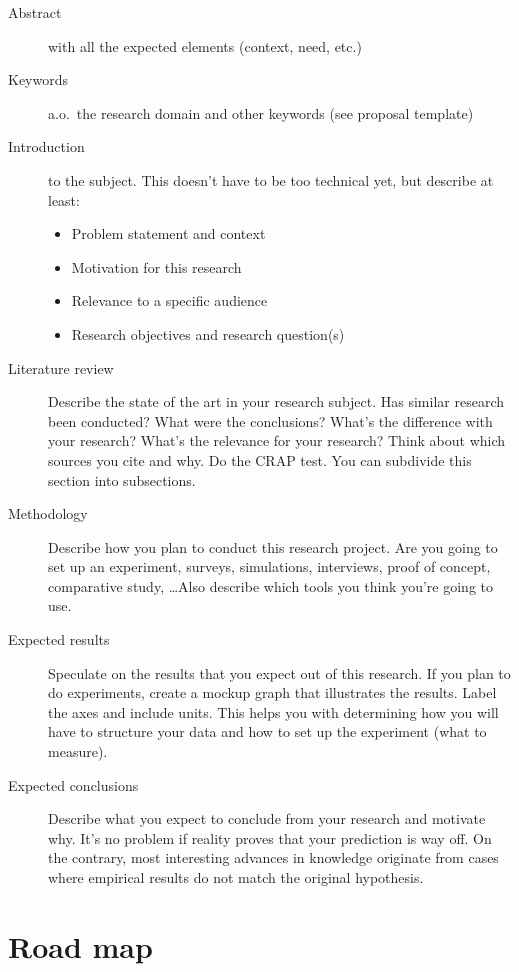 \documentclass[fleqn,10pt]{artikeltin}
\begin{document}
\begin{description}
  \item[Abstract] with all the expected elements (context, need, etc.)
  \item[Keywords] a.o.~the research domain and other keywords (see proposal template)
  \item[Introduction] to the subject. This doesn't have to be too technical yet, but describe at least:
  \begin{itemize}
    \item Problem statement and context
    \item Motivation for this research
    \item Relevance to a specific audience
    \item Research objectives and research question(s)
  \end{itemize}
  \item[Literature review] Describe the state of the art in your research subject. Has similar research been conducted? What were the conclusions? What's the difference with your research? What's the relevance for your research? Think about which sources you cite and why. Do the CRAP test. You can subdivide this section into subsections.
  \item[Methodology] Describe how you plan to conduct this research project. Are you going to set up an experiment, surveys, simulations, interviews, proof of concept, comparative study, \ldots Also describe which tools you think you're going to use.
  \item[Expected results] Speculate on the results that you expect out of this research. If you plan to do experiments, create a mockup graph that illustrates the results. Label the axes and include units. This helps you with determining how you will have to structure your data and how to set up the experiment (what to measure).
  \item[Expected conclusions] Describe what you expect to conclude from your research and motivate why. It's no problem if reality proves that your prediction is way off. On the contrary, most interesting advances in knowledge originate from cases where empirical results do not match the original hypothesis.
\end{description}

\section{Road map}
\label{sec:roadmap}
\end{document}
